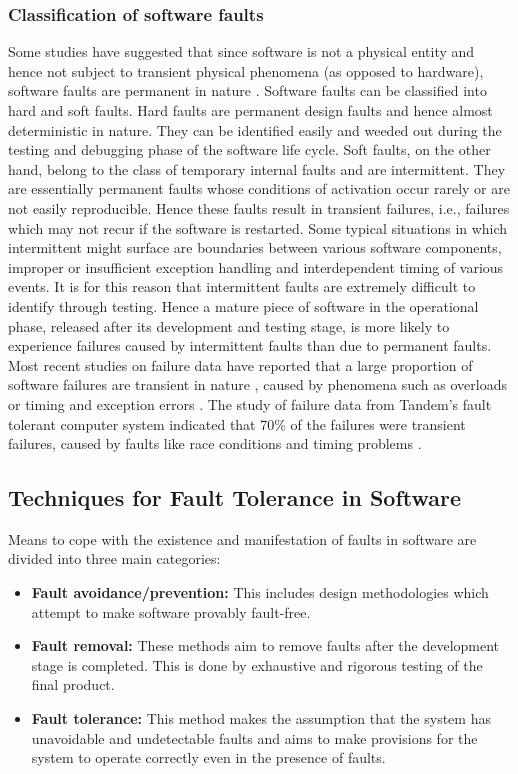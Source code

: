 \documentclass[a4paper, 11pt]{article}
\begin{document}
\subsubsection{Classification of software faults}
Some studies have suggested that since software is not a physical entity and hence not subject to transient physical phenomena (as opposed to hardware), software faults are permanent in nature \citep{huang1994two}. Software faults can be classified into hard and soft faults. Hard faults are permanent design faults and hence almost deterministic in nature. They can be identified easily and weeded out during the testing and debugging phase of the software life cycle. Soft faults, on the other hand, belong to the class of temporary internal faults and are intermittent. They are essentially permanent faults whose conditions of activation occur rarely or are not easily reproducible. Hence these faults result in transient failures, i.e., failures which may not recur if the software is restarted. Some typical situations in which intermittent might surface are boundaries between various software components, improper or insufficient exception handling and interdependent timing of various events. It is for this reason that intermittent faults are extremely difficult to identify through testing. Hence a mature piece of software in the operational phase, released after its development and testing stage, is more likely to experience failures caused by intermittent faults than due to permanent faults. Most recent studies on failure data have reported that a large proportion of software failures are transient in nature \citep{gray1990census}, caused by phenomena such as overloads or timing and exception errors \citep{chillarege1995measurement}. The study of failure data from Tandem's fault tolerant computer system indicated that 70\% of the failures were transient failures, caused by faults like race conditions and timing problems \citep{lee1995software}.

\subsection{Techniques for Fault Tolerance in Software}
Means to cope with the existence and manifestation of faults in software are divided into three main categories:

\begin{itemize}
\item \textbf{Fault avoidance/prevention:} This includes design methodologies which attempt to make software provably fault-free.
\item \textbf{Fault removal:} These methods aim to remove faults after the development stage is completed. This is done by exhaustive and rigorous testing of the final product.
\item \textbf{Fault tolerance:} This method makes the assumption that the system has unavoidable and undetectable faults and aims to make provisions for the system to operate correctly even in the presence of faults.
\end{itemize}
\end{document}
